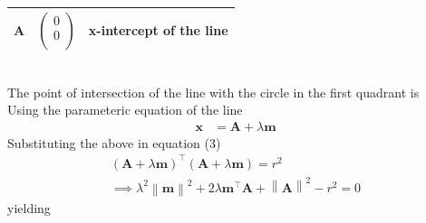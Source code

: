 \documentclass[10pt,a4paper]{report}
\providecommand{\norm}[1]{\left\lVert#1\right\rVert}
\let\vec\mathbf
\begin{document}
\begin{multicols}{2}
{\begin{tabular}{|c|c|c|}
	$\vec A$ & $\begin{pmatrix}0 \\ 0 \\ \end{pmatrix}$ & x-intercept of the line\\
	\hline                                                                                          
\end{tabular}\\
The point of intersection of the line with the circle in the first quadrant is \\
Using the parameteric equation of the line                                                  
	  \begin{align}                                                                                 
	  \vec{x} &= \vec{A} + \lambda \vec{m}                                                
	  \end{align}                                                                                 
	  Substituting the above in equation (3)                               
	  \begin{align}                                                                            
		  ({ \vec{A} + \lambda \vec{m}})^{\top}                                            
		  ({ \vec{A} + \lambda \vec{m}})
               = r^2  \\
                              \implies \lambda^2\norm{\vec{m}}^2+ 2 \lambda \vec{m}^{\top}\vec{A}   +\norm{\vec{A}}^2 - r^2 = 0
	  \end{align}
yielding                                                                                    
	                                                                                       
}
\end{multicols}
\end{document}
